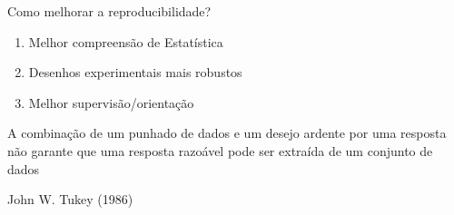 \documentclass{beamer}
\begin{document}
\begin{frame}
  \begin{block}{Como melhorar a reproducibilidade?}
    \begin{enumerate}
    \item Melhor compreensão de Estatística
    \item Desenhos experimentais mais robustos
    \item Melhor supervisão/orientação
    \end{enumerate}
  \end{block}
\end{frame}

\begin{frame}
  \begin{block}{}
    A combinação de um punhado de dados e um desejo ardente por uma resposta não garante que uma resposta razoável pode ser extraída de um conjunto de dados
  \end{block}
\hfill John W. Tukey (1986)
\end{frame}
\end{document}
